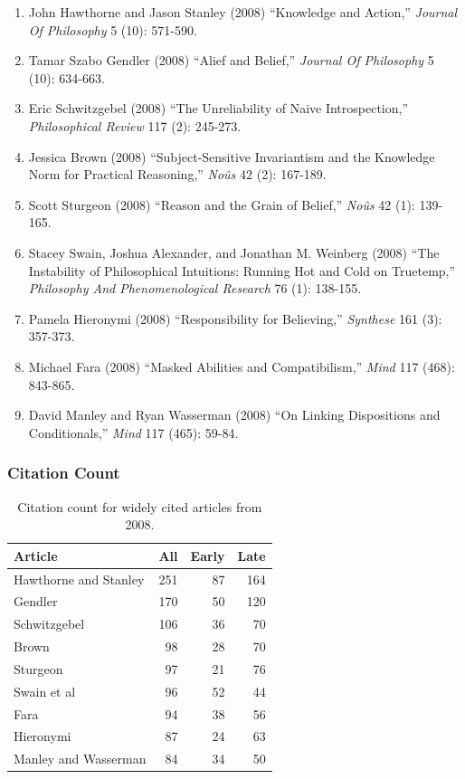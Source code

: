 \documentclass[
  10pt,
  letterpaper,
  DIV=11,
  numbers=noendperiod,
  twoside]{scrartcl}
\providecommand{\tightlist}{%
  \setlength{\itemsep}{0pt}\setlength{\parskip}{0pt}}\usepackage{longtable,booktabs,array}
\begin{document}
\begin{enumerate}
\def\labelenumi{\arabic{enumi}.}
\tightlist
\item
  John Hawthorne and Jason Stanley (2008) ``Knowledge and Action,''
  \emph{Journal Of Philosophy} 5 (10): 571-590.
\item
  Tamar Szabo Gendler (2008) ``Alief and Belief,'' \emph{Journal Of
  Philosophy} 5 (10): 634-663.
\item
  Eric Schwitzgebel (2008) ``The Unreliability of Naive Introspection,''
  \emph{Philosophical Review} 117 (2): 245-273.
\item
  Jessica Brown (2008) ``Subject-Sensitive Invariantism and the
  Knowledge Norm for Practical Reasoning,'' \emph{Noûs} 42 (2): 167-189.
\item
  Scott Sturgeon (2008) ``Reason and the Grain of Belief,'' \emph{Noûs}
  42 (1): 139-165.
\item
  Stacey Swain, Joshua Alexander, and Jonathan M. Weinberg (2008) ``The
  Instability of Philosophical Intuitions: Running Hot and Cold on
  Truetemp,'' \emph{Philosophy And Phenomenological Research} 76 (1):
  138-155.
\item
  Pamela Hieronymi (2008) ``Responsibility for Believing,''
  \emph{Synthese} 161 (3): 357-373.
\item
  Michael Fara (2008) ``Masked Abilities and Compatibilism,''
  \emph{Mind} 117 (468): 843-865.
\item
  David Manley and Ryan Wasserman (2008) ``On Linking Dispositions and
  Conditionals,'' \emph{Mind} 117 (465): 59-84.
\end{enumerate}

\subsubsection*{Citation Count}\label{sec-count-2008}

\begin{longtable}[]{@{}lrrr@{}}

\caption{\label{tbl-citation-count-2008}Citation count for widely cited
articles from 2008.}

\tabularnewline

\toprule\noalign{}
Article & All & Early & Late \\
\midrule\noalign{}
\endhead
\bottomrule\noalign{}
\endlastfoot
Hawthorne and Stanley & 251 & 87 & 164 \\
Gendler & 170 & 50 & 120 \\
Schwitzgebel & 106 & 36 & 70 \\
Brown & 98 & 28 & 70 \\
Sturgeon & 97 & 21 & 76 \\
Swain et al & 96 & 52 & 44 \\
Fara & 94 & 38 & 56 \\
Hieronymi & 87 & 24 & 63 \\
Manley and Wasserman & 84 & 34 & 50 \\

\end{longtable}
\end{document}
